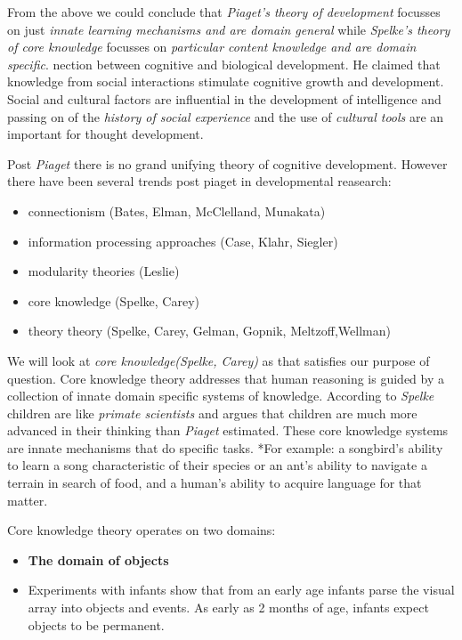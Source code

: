 \documentclass[11pt]{article}
\providecommand{\tightlist}{%
      \setlength{\itemsep}{0pt}\setlength{\parskip}{0pt}}
\begin{document}
From the above we could conclude that \emph{Piaget's theory of
development} focusses on just \emph{innate learning mechanisms and are
domain general} while \emph{Spelke's theory of core knowledge} focusses
on \emph{particular content knowledge and are domain specific}. nection
between cognitive and biological development. He claimed that knowledge
from social interactions stimulate cognitive growth and development.
Social and cultural factors are influential in the development of
intelligence and passing on of the \emph{history of social experience}
and the use of \emph{cultural tools} are an important for thought
development.

    Post \emph{Piaget} there is no grand unifying theory of cognitive
development. However there have been several trends post piaget in
developmental reasearch:

\begin{itemize}
\tightlist
\item
  connectionism (Bates, Elman, McClelland, Munakata)
\item
  information processing approaches (Case, Klahr, Siegler)
\item
  modularity theories (Leslie)
\item
  core knowledge (Spelke, Carey)
\item
  theory theory (Spelke, Carey, Gelman, Gopnik, Meltzoff,Wellman)
\end{itemize}

We will look at \emph{core knowledge(Spelke, Carey)} as that satisfies
our purpose of question. Core knowledge theory addresses that human
reasoning is guided by a collection of innate domain specific systems of
knowledge. According to \emph{Spelke} children are like \emph{primate
scientists} and argues that children are much more advanced in their
thinking than \emph{Piaget} estimated. These core knowledge systems are
innate mechanisms that do specific tasks. *For example: a songbird's
ability to learn a song characteristic of their species or an ant's
ability to navigate a terrain in search of food, and a human's ability
to acquire language for that matter.

Core knowledge theory operates on two domains:

\begin{itemize}
\tightlist
\item
  \textbf{The domain of objects}
\item
  Experiments with infants show that from an early age infants parse the
  visual array into objects and events. As early as 2 months of age,
  infants expect objects to be permanent.
\end{itemize}
\end{document}
